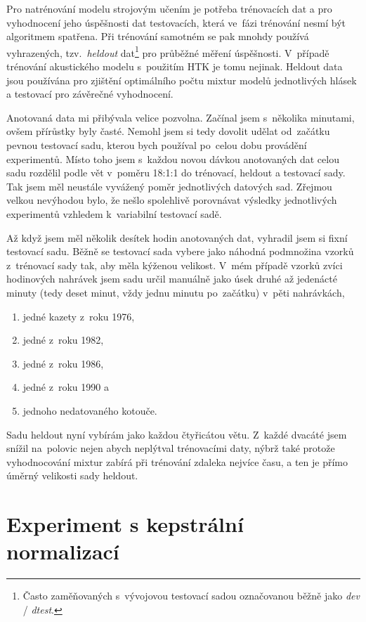 Pro natrénování modelu strojovým učením je potřeba trénovacích dat a pro
vyhodnocení jeho úspěšnosti dat testovacích, která ve~fázi trénování nesmí být
algoritmem spatřena. Při trénování samotném se pak mnohdy používá vyhrazených,
tzv.~\textit{heldout} dat\footnote{Často zaměňovaných s~vývojovou testovací sadou
označovanou běžně jako \textit{dev} / \textit{dtest}.} pro průběžné měření úspěšnosti. V~případě trénování
akustického modelu s~použitím HTK je tomu nejinak. Heldout data jsou používána
pro zjištění optimálního počtu mixtur modelů jednotlivých hlásek a testovací
pro závěrečné vyhodnocení.

Anotovaná data mi přibývala velice pozvolna. Začínal jsem s~několika minutami,
ovšem přírůstky byly časté. Nemohl jsem si tedy dovolit udělat od~začátku pevnou
testovací sadu, kterou bych používal po~celou dobu provádění experimentů. Místo
toho jsem s~každou novou dávkou anotovaných dat celou sadu rozdělil podle vět
v~poměru 18:1:1 do trénovací, heldout a testovací sady. Tak jsem měl neustále
vyvážený poměr jednotlivých datových sad. Zřejmou velkou nevýhodou bylo, že
nešlo spolehlivě porovnávat výsledky jednotlivých experimentů vzhledem
k~variabilní testovací sadě.

Až když jsem měl několik desítek hodin anotovaných dat, vyhradil jsem si fixní
testovací sadu. Běžně se testovací sada vybere jako náhodná podmnožina vzorků
z~trénovací sady tak, aby měla kýženou velikost. V~mém případě vzorků zvíci
hodinových nahrávek jsem sadu určil manuálně jako úsek druhé až jedenácté minuty
(tedy deset minut, vždy jednu minutu po~začátku) v~pěti nahrávkách,
\begin{enumerate}
\item{jedné kazety z~roku 1976,}
\item{jedné z~roku 1982,}
\item{jedné z~roku 1986,}
\item{jedné z~roku 1990 a}
\item{jednoho nedatovaného kotouče.}
\end{enumerate}

Sadu heldout nyní vybírám jako každou čtyřicátou větu. Z~každé dvacáté jsem
snížil na~polovic nejen abych neplýtval trénovacími daty, nýbrž také protože
vyhodnocování mixtur zabírá při trénování zdaleka nejvíce času, a ten je přímo
úměrný velikosti sady heldout.

\section{Experiment s kepstrální normalizací}
\label{sec:mfcc-norm}

